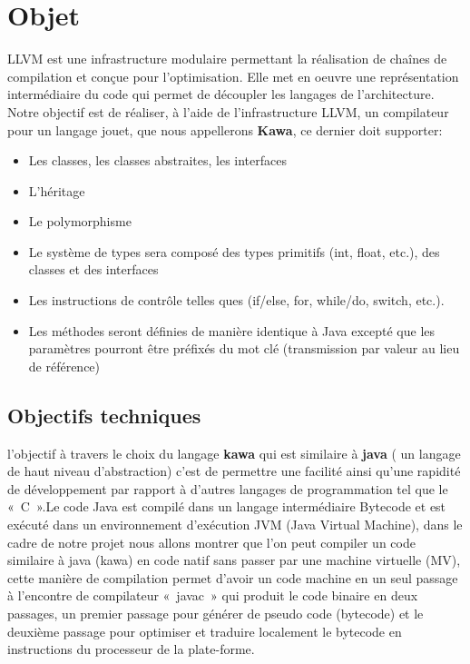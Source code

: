 \documentclass{../res/univ-projet}
\begin{document}
\maketitle
\newpage
\tableofcontents
\newpage

\section{Objet}

LLVM est une infrastructure modulaire permettant la réalisation de
chaînes de compilation et conçue pour l'optimisation. Elle met en oeuvre
une représentation intermédiaire du code qui permet de découpler les
langages de l'architecture. Notre objectif est de réaliser, à l'aide de
l'infrastructure LLVM, un compilateur pour un langage jouet, que nous
appellerons \textbf {Kawa}, ce dernier doit supporter:
 \begin{itemize}
 	\item	Les classes, les classes abstraites, les interfaces
	\item   L'héritage
	\item   Le polymorphisme
	\item   Le système de types sera composé des types primitifs
	  (int, float, etc.), des classes et des interfaces
	\item   Les instructions de contrôle telles ques (if/else, for,
	  while/do, switch, etc.).
	\item   Les méthodes seront définies de manière identique à Java
	  excepté que les paramètres pourront être préfixés du mot clé
	   (transmission par valeur au lieu de référence)
 \end{itemize}


\subsection{Objectifs techniques}
l'objectif  à travers le choix du langage \textbf {kawa} qui est similaire  à \textbf {java} ( un langage de haut niveau d'abstraction) c'est de permettre une facilité ainsi qu'une rapidité de développement par rapport à d'autres langages de programmation tel que le « C ».Le code Java  est compilé dans un langage intermédiaire  Bytecode et est exécuté dans un environnement d'exécution JVM (Java Virtual Machine), dans le cadre de notre projet nous allons montrer que l'on peut compiler un code similaire à java (kawa) en code natif sans passer par une machine virtuelle (MV), cette manière de compilation permet d'avoir un code machine en un seul passage à l'encontre de compilateur « javac » qui produit le code binaire en deux passages, un premier passage  pour générer de pseudo code (bytecode) et le deuxième passage  pour optimiser et traduire localement le bytecode en instructions du processeur de la plate-forme.
\end{document}
